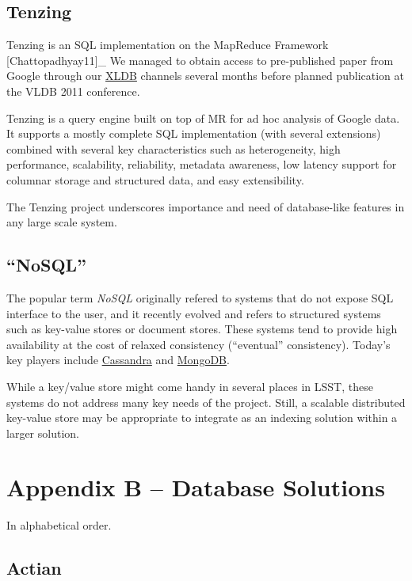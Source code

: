 \documentclass[DM,lsstdraft,toc]{lsstdoc}
\begin{document}
\subsection{Tenzing}\label{tenzing}

Tenzing is an SQL implementation on the MapReduce Framework
{[}Chattopadhyay11{]}\_ We managed to obtain access to pre-published
paper from Google through our \href{http://xldb.org}{XLDB} channels
several months before planned publication at the VLDB 2011 conference.

Tenzing is a query engine built on top of MR for ad hoc analysis of
Google data. It supports a mostly complete SQL implementation (with
several extensions) combined with several key characteristics such as
heterogeneity, high performance, scalability, reliability, metadata
awareness, low latency support for columnar storage and structured data,
and easy extensibility.

The Tenzing project underscores importance and need of database-like
features in any large scale system.

\subsection{\texorpdfstring{``NoSQL''}{NoSQL}}\label{nosql}

The popular term \emph{NoSQL} originally refered to systems that do not
expose SQL interface to the user, and it recently evolved and refers to
structured systems such as key-value stores or document stores. These
systems tend to provide high availability at the cost of relaxed
consistency (``eventual'' consistency). Today's key players include
\href{http://cassandra.apache.org/}{Cassandra} and
\href{http://www.mongodb.org/}{MongoDB}.

While a key/value store might come handy in several places in LSST,
these systems do not address many key needs of the project. Still, a
scalable distributed key-value store may be appropriate to integrate as
an indexing solution within a larger solution.

\section{Appendix B -- Database
Solutions}\label{appendix-b-database-solutions}

In alphabetical order.

\subsection{Actian}\label{actian}
\end{document}
